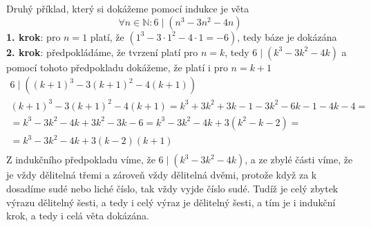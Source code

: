 \documentclass[12pt]{article}
\begin{document}
Druhý příklad, který si dokážeme pomocí indukce je věta \[\forall n \in \mathbb{N}: 6\mid(n^3 -3n^2 - 4n)\]
\textbf{1. krok}: pro $n = 1$ platí, že $(1^3 -3\cdot 1^2 - 4\cdot 1 = -6)$, tedy báze je dokázána\\
\textbf{2. krok}: předpokládáme, že tvrzení platí pro $n = k$, tedy $6\mid(k^3 -3k^2 - 4k)$
a pomocí tohoto předpokladu dokážeme, že platí i pro $n = k + 1$
\begin{align*}
6\mid((k+1)^3 -3(k+1)^2 - 4(k+1))\\
(k+1)^3 -3(k+1)^2 - 4(k+1) = k^3 + 3k^2 + 3k - 1 - 3k^2 - 6k - 1 - 4k - 4 =\\
= k^3 - 3k^2 - 4k + 3k^2 - 3k -6 = k^3 - 3k^2 - 4k + 3(k^2 - k -2) = \\
= k^3 - 3k^2 - 4k + 3(k-2)(k + 1)\\
\end{align*}
Z indukčního předpokladu víme, že $6\mid(k^3 -3k^2 - 4k)$, a ze zbylé části víme, že je vždy dělitelná třemi a zároveň vždy dělitelná dvěmi, protože když za k dosadíme sudé nebo liché číslo, tak vždy vyjde číslo sudé. Tudíž je celý zbytek výrazu dělitelný šesti, a tedy i celý výraz je dělitelný šesti, a tím je i indukční krok, a tedy i celá věta dokázána.
\end{document}
